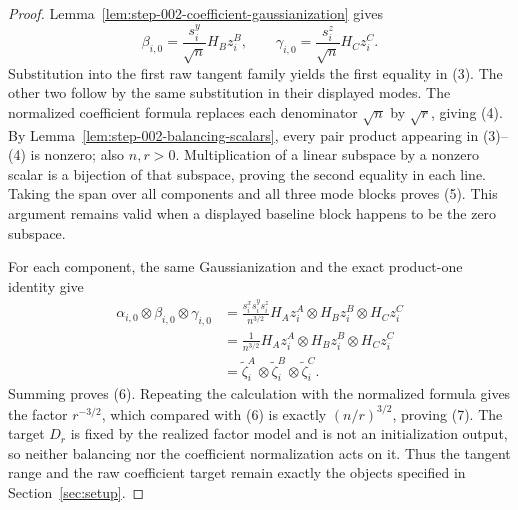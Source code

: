 \begin{proof}
Lemma~\ref{lem:step-002-coefficient-gaussianization}
gives
\[
  \beta_{i,0}=\frac{s_i^y}{\sqrt n}H_Bz_i^B,
  \qquad
  \gamma_{i,0}=\frac{s_i^z}{\sqrt n}H_Cz_i^C.
\]
Substitution into the first raw tangent family yields the first equality in
(3). The other two follow by the same substitution in their displayed modes.
The normalized coefficient formula replaces each denominator \(\sqrt n\) by
\(\sqrt r\), giving (4). By
Lemma~\ref{lem:step-002-balancing-scalars}, every pair product appearing in
(3)--(4) is nonzero; also \(n,r>0\). Multiplication of a linear subspace by a
nonzero scalar is a bijection of that subspace, proving the second equality in
each line. Taking the span over all components and all three mode blocks proves
(5). This argument remains valid when a displayed baseline block happens to
be the zero subspace.

For each component, the same Gaussianization and the exact product-one identity
give
\[
  \begin{aligned}
  \alpha_{i,0}\otimes\beta_{i,0}\otimes\gamma_{i,0}
  &=\frac{s_i^xs_i^ys_i^z}{n^{3/2}}
      H_Az_i^A\otimes H_Bz_i^B\otimes H_Cz_i^C\\
  &=\frac1{n^{3/2}}
      H_Az_i^A\otimes H_Bz_i^B\otimes H_Cz_i^C\\
  &=\widetilde\zeta_i^A\otimes
    \widetilde\zeta_i^B\otimes
    \widetilde\zeta_i^C.
  \end{aligned}
\]
Summing proves (6). Repeating the calculation with the normalized formula
gives the factor \(r^{-3/2}\), which compared with (6) is exactly
\((n/r)^{3/2}\), proving (7). The target \(D_r\) is fixed by the realized
factor model and is not an initialization output, so neither balancing nor the
coefficient normalization acts on it. Thus the tangent range and the raw
coefficient target remain exactly the objects specified in Section~\ref{sec:setup}.


\end{proof}

